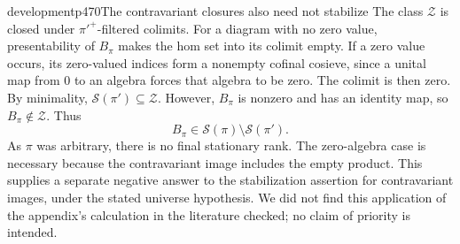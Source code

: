 \begin{dcomment}{development}{p470}{The contravariant closures also need not stabilize}
The class $\mathcal Z$ is closed under $\pi'^+$-filtered colimits. For a diagram with no zero value, presentability of $B_\pi$ makes the hom set into its colimit empty. If a zero value occurs, its zero-valued indices form a nonempty cofinal cosieve, since a unital map from $0$ to an algebra forces that algebra to be zero. The colimit is then zero. By minimality, $\mathcal S(\pi')\subseteq\mathcal Z$. However, $B_\pi$ is nonzero and has an identity map, so $B_\pi\notin\mathcal Z$. Thus
\[
 B_\pi\in\mathcal S(\pi)\setminus\mathcal S(\pi').
\]
As $\pi$ was arbitrary, there is no final stationary rank. The zero-algebra case is necessary because the contravariant image includes the empty product. This supplies a separate negative answer to the stabilization assertion for contravariant images, under the stated universe hypothesis. We did not find this application of the appendix's calculation in the literature checked; no claim of priority is intended.
\end{dcomment}

